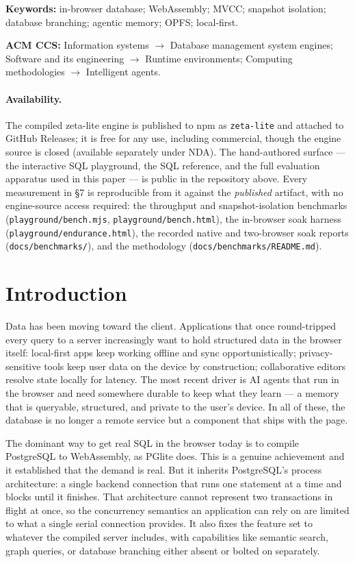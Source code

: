 \documentclass[11pt]{article}
\begin{document}
\vspace{0.5em}
\noindent\textbf{Keywords:} in-browser database; WebAssembly; MVCC; snapshot
isolation; database branching; agentic memory; OPFS; local-first.

\vspace{0.25em}
\noindent\textbf{ACM CCS:} Information systems $\rightarrow$ Database management
system engines; Software and its engineering $\rightarrow$ Runtime environments;
Computing methodologies $\rightarrow$ Intelligent agents.

\paragraph{Availability.}
The compiled zeta-lite engine is published to npm as \texttt{zeta-lite} and
attached to GitHub Releases; it is free for any use, including commercial, though
the engine source is closed (available separately under NDA). The hand-authored
surface --- the interactive SQL playground, the SQL reference, and the full
evaluation apparatus used in this paper --- is public in the repository above.
Every measurement in \S7 is reproducible from it against the \emph{published}
artifact, with no engine-source access required: the throughput and
snapshot-isolation benchmarks (\texttt{playground/bench.mjs},
\texttt{playground/bench.html}), the in-browser soak harness
(\texttt{playground/endurance.html}), the recorded native and two-browser soak
reports (\texttt{docs/benchmarks/}), and the methodology
(\texttt{docs/benchmarks/README.md}).

\section{Introduction}

Data has been moving toward the client. Applications that once round-tripped every
query to a server increasingly want to hold structured data in the browser itself:
local-first apps keep working offline and sync opportunistically; privacy-sensitive
tools keep user data on the device by construction; collaborative editors resolve
state locally for latency. The most recent driver is AI agents that run in the
browser and need somewhere durable to keep what they learn --- a memory that is
queryable, structured, and private to the user's device. In all of these, the
database is no longer a remote service but a component that ships with the page.

The dominant way to get real SQL in the browser today is to compile PostgreSQL to
WebAssembly, as PGlite does. This is a genuine achievement and it established that
the demand is real. But it inherits PostgreSQL's process architecture: a single
backend connection that runs one statement at a time and blocks until it finishes.
That architecture cannot represent two transactions in flight at once, so the
concurrency semantics an application can rely on are limited to what a single
serial connection provides. It also fixes the feature set to whatever the compiled
server includes, with capabilities like semantic search, graph queries, or
database branching either absent or bolted on separately.
\end{document}
